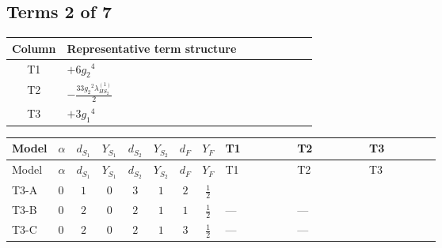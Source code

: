 \documentclass[8pt]{article}
\begin{document}
\begin{landscape}
\subsection*{Terms 2 of 7}
\begin{center}
\begin{tabular}{@{}c >{\raggedright\arraybackslash}p{0.82\linewidth}@{}}
\toprule
Column & Representative term structure \\
\midrule
T1 & \(\displaystyle +6 {g_2}^4\) \\
\midrule
T2 & \(\displaystyle -\frac{33 {g_2}^2 {\lambda_{HS_2}^{(1)}}}{2}\) \\
\midrule
T3 & \(\displaystyle +3 {g_1}^4\) \\
\midrule
\bottomrule
\end{tabular}
\end{center}
\smallskip
\tiny
\begin{longtable}{@{}llcccccc >{\raggedright\arraybackslash}p{0.21\linewidth} >{\raggedright\arraybackslash}p{0.21\linewidth} >{\raggedright\arraybackslash}p{0.21\linewidth}@{}}
\toprule
Model & $\alpha$ & $d_{S_1}$ & $Y_{S_1}$ & $d_{S_2}$ & $Y_{S_2}$ & $d_F$ & $Y_F$ & T1 & T2 & T3 \\
\midrule
\endfirsthead
\toprule
Model & $\alpha$ & $d_{S_1}$ & $Y_{S_1}$ & $d_{S_2}$ & $Y_{S_2}$ & $d_F$ & $Y_F$ & T1 & T2 & T3 \\
\midrule
\endhead
T3-A & $0$ & $1$ & $0$ & $3$ & $1$ & $2$ & $\frac{1}{2}$ & \scriptsize\adjustbox{max width=\linewidth}{$\begin{gathered} +6 {g_2}^4\end{gathered}$} & \scriptsize\adjustbox{max width=\linewidth}{$\begin{gathered} -\frac{33 {g_2}^2 {\lambda_{HS_2}^{(1)}}}{2}\end{gathered}$} & \scriptsize\adjustbox{max width=\linewidth}{$\begin{gathered} +3 {g_1}^4\end{gathered}$} \\
\midrule
T3-B & $0$ & $2$ & $0$ & $2$ & $1$ & $1$ & $\frac{1}{2}$ & --- & --- & \scriptsize\adjustbox{max width=\linewidth}{$\begin{gathered} +3 {g_1}^4\end{gathered}$} \\
\midrule
T3-C & $0$ & $2$ & $0$ & $2$ & $1$ & $3$ & $\frac{1}{2}$ & --- & --- & \scriptsize\adjustbox{max width=\linewidth}{$\begin{gathered} +3 {g_1}^4\end{gathered}$} \\

\end{longtable}
\end{landscape}
\end{document}
